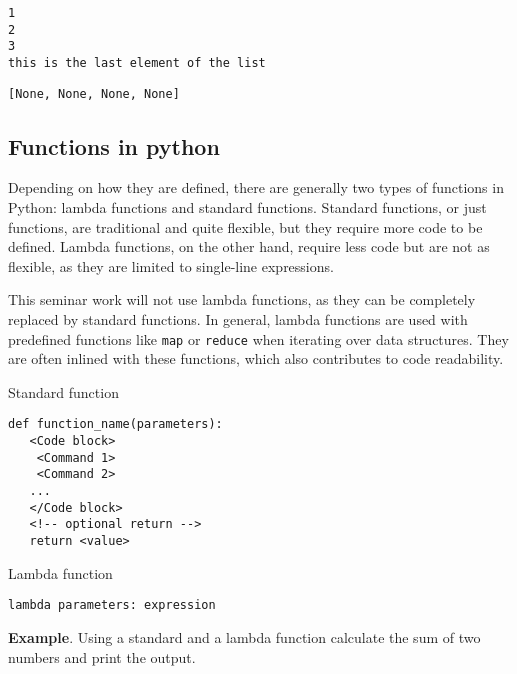 \documentclass[11pt]{article}
\makeatletter
\newcommand{\boxspacing}{\kern\kvtcb@left@rule\kern\kvtcb@boxsep}
\newcommand{\prompt}[4]{
        {\ttfamily\llap{{\color{#2}[#3]:\hspace{3pt}#4}}\vspace{-\baselineskip}}
    }
\makeatother
\begin{document}
    \begin{Verbatim}[commandchars=\\\{\}]
1
2
3
this is the last element of the list
    \end{Verbatim}

            \begin{tcolorbox}[breakable, size=fbox, boxrule=.5pt, pad at break*=1mm, opacityfill=0]
\prompt{Out}{outcolor}{13}{\boxspacing}
\begin{Verbatim}[commandchars=\\\{\}]
[None, None, None, None]
\end{Verbatim}
\end{tcolorbox}
        
    \newpage

\subsection{Functions in python}\label{functions-in-python}

Depending on how they are defined, there are generally two types of
functions in Python: lambda functions and standard functions. Standard
functions, or just functions, are traditional and quite flexible, but
they require more code to be defined. Lambda functions, on the other
hand, require less code but are not as flexible, as they are limited to
single-line expressions.

This seminar work will not use lambda functions, as they can be
completely replaced by standard functions. In general, lambda functions
are used with predefined functions like \texttt{map} or \texttt{reduce}
when iterating over data structures. They are often inlined with these
functions, which also contributes to code readability.

Standard function

\begin{verbatim}
def function_name(parameters):
   <Code block>
    <Command 1>
    <Command 2>
   ...
   </Code block>
   <!-- optional return -->
   return <value>
\end{verbatim}

Lambda function

\begin{verbatim}
lambda parameters: expression
\end{verbatim}

\textbf{Example}. Using a standard and a lambda function calculate the
sum of two numbers and print the output.
\end{document}
